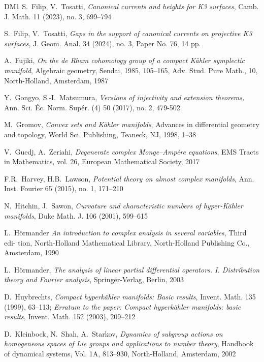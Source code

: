 \documentclass[11pt]{article}
\newcommand{\6}{\partial}
\begin{document}
{\begin{thebibliography}{DM1}
S.\ Filip, V.\ Tosatti,
{\em Canonical currents and heights for K3 surfaces},
Camb. J. Math. 11 (2023), no. 3, 699--794

S.\ Filip, V.\ Tosatti,
{\em Gaps in the support of canonical currents on projective K3 surfaces},
J. Geom. Anal. 34 (2024), no. 3, Paper No. 76, 14 pp.

A.\ Fujiki, {\it On the de Rham cohomology group of a compact Kähler symplectic manifold},
Algebraic geometry, Sendai, 1985, 105--165, Adv. Stud. Pure Math., 10, North-Holland, Amsterdam, 1987 

Y.\ Gongyo, S.-I.\ Matsumura,
{\em Versions of injectivity and extension theorems,}
Ann. Sci. \'Ec. Norm. Sup\'er. (4) 50 (2017), no. 2, 479-502. 

M.\ Gromov, {\it Convex sets and K\"ahler manifolds}, Advances in differential geometry
and topology, World Sci. Publishing, Teaneck, NJ, 1998, 1--38

V.\ Guedj, A.\ Zeriahi, {\it Degenerate complex Monge--Amp\`ere equations},
EMS Tracts in Mathematics, vol. 26, European Mathematical Society, 2017

F.R.\ Harvey, H.B.\ Lawson, {\it Potential theory on almost complex manifolds},
Ann. Inst. Fourier 65 (2015), no. 1, 171--210 

N.\ Hitchin, J.\ Sawon, {\it Curvature and characteristic numbers of hyper-K\"ahler manifolds},
Duke Math. J. 106 (2001), 599--615

L.\ H\"ormander {\it An introduction to complex analysis in several variables}, Third edi-
tion, North-Holland Mathematical Library, North-Holland Publishing Co., Amsterdam, 1990

L.\ H\"ormander, {\it The analysis of linear partial differential operators. I.
Distribution theory and Fourier analysis}, Springer-Verlag, Berlin, 2003

D.\ Huybrechts, {\it Compact hyperk\"ahler manifolds: Basic results}, Invent. Math. 135 (1999), 63--113;
{\em Erratum to the paper: Compact hyperk\"ahler manifolds: basic results},  Invent. Math. 152 (2003), 209--212

D.\ Kleinbock, N.\ Shah, A.\ Starkov, {\it Dynamics of subgroup actions on homogeneous spaces of
Lie groups and applications to number theory}, Handbook of dynamical systems, Vol. 1A, 813--930, North-Holland,
Amsterdam, 2002


\end{thebibliography}}
\end{document}
